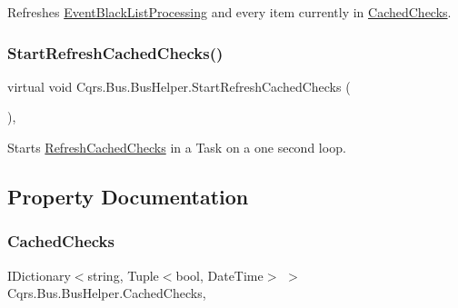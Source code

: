 Refreshes \hyperlink{classCqrs_1_1Bus_1_1BusHelper_ae8d3525369ee9572de06f935cc09510b_ae8d3525369ee9572de06f935cc09510b}{Event\+Black\+List\+Processing} and every item currently in \hyperlink{classCqrs_1_1Bus_1_1BusHelper_ae29e80bd315b6284509c9fd0b977d2a0_ae29e80bd315b6284509c9fd0b977d2a0}{Cached\+Checks}. 

\mbox{\label{classCqrs_1_1Bus_1_1BusHelper_a23bfab1be70af651cc48033fcdf4ce2c_a23bfab1be70af651cc48033fcdf4ce2c}} 
\subsubsection{\texorpdfstring{Start\+Refresh\+Cached\+Checks()}{StartRefreshCachedChecks()}}
{\footnotesize\ttfamily virtual void Cqrs.\+Bus.\+Bus\+Helper.\+Start\+Refresh\+Cached\+Checks (\begin{DoxyParamCaption}{ }\end{DoxyParamCaption})\hspace{0.3cm}{\ttfamily [protected]}, {\ttfamily [virtual]}}



Starts \hyperlink{classCqrs_1_1Bus_1_1BusHelper_ad589391a51cd61673d2403ee8012e713_ad589391a51cd61673d2403ee8012e713}{Refresh\+Cached\+Checks} in a Task on a one second loop. 



\subsection{Property Documentation}
\mbox{\label{classCqrs_1_1Bus_1_1BusHelper_ae29e80bd315b6284509c9fd0b977d2a0_ae29e80bd315b6284509c9fd0b977d2a0}} 
\subsubsection{\texorpdfstring{Cached\+Checks}{CachedChecks}}
{\footnotesize\ttfamily I\+Dictionary$<$string, Tuple$<$bool, Date\+Time$>$ $>$ Cqrs.\+Bus.\+Bus\+Helper.\+Cached\+Checks\hspace{0.3cm}{\ttfamily [get]}, {\ttfamily [protected]}}



